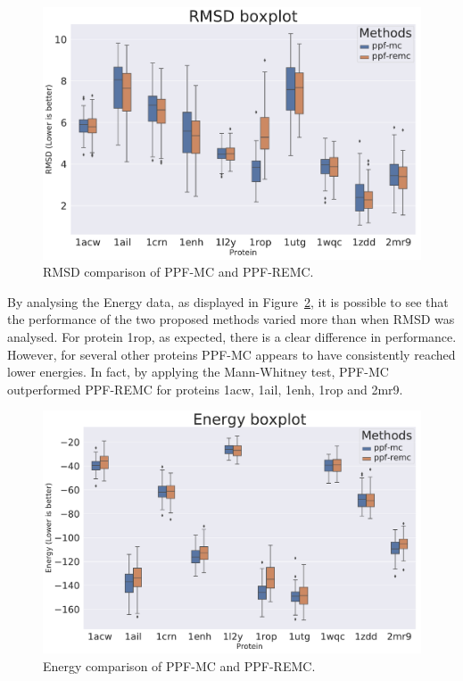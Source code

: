 \begin{figure}
  \centering
  \includegraphics[width=1\textwidth]{Figuras/boxplots/duel_boxplot_best_by_rmsd_rmsd_after.pdf}
  \caption{RMSD comparison of PPF-MC and PPF-REMC.}
  \label{fig:duel-boxplot-rmsd}
\end{figure}

By analysing the Energy data, as displayed in
Figure~\ref{fig:duel-boxplot-energy}, it is possible to see that the performance
of the two proposed methods varied more than when RMSD was analysed. For protein
1rop, as expected, there is a clear difference in performance. However, for
several other proteins PPF-MC appears to have consistently reached lower
energies. In fact, by applying the Mann-Whitney test, PPF-MC outperformed
PPF-REMC for proteins 1acw, 1ail, 1enh, 1rop and 2mr9.

\begin{figure}
  \centering
  \includegraphics[width=1\textwidth]{Figuras/boxplots/duel_boxplot_best_by_energy_scorefxn}
  \caption{Energy comparison of PPF-MC and PPF-REMC.}
  \label{fig:duel-boxplot-energy}
\end{figure}

